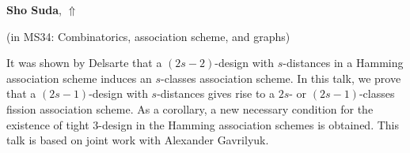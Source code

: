 \documentclass[ILAS2025-program.tex]{subfiles}
\begin{document}
\hypertarget{down0286}{}\begin{ilasabstract}
    
\textbf{Sho Suda},  \hfill \hyperlink{up0286}{$\Uparrow$}
    
    
(in {\color{mstitle}MS34: Combinatorics, association scheme, and graphs})
        
\mtskip
    It was shown by Delsarte that a $(2s-2)$-design with $s$-distances in a Hamming association scheme 
induces an $s$-classes association scheme. 
In this talk, we prove that a $(2s-1)$-design with $s$-distances gives rise to a $2s$- 
or $(2s-1)$-classes fission association scheme. 
As a corollary, a new necessary condition for the existence of tight $3$-design in the Hamming association schemes is obtained. 
This talk is based on joint work with Alexander Gavrilyuk. 

\end{ilasabstract}
    
\end{document}
